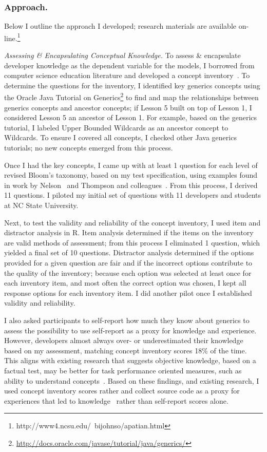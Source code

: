 \documentclass{llncs}
\begin{document}
\subsubsection{Approach.}
Below I outline the approach I developed; research materials are available on-line.\footnote{http://www4.ncsu.edu/~bijohnso/apatian.html}

\vspace{0.5em}
\noindent\textit{Assessing \& Encapsulating Conceptual Knowledge.}
To assess \& encapsulate developer knowledge as the dependent variable for the models, I borrowed from computer science education literature and developed a concept inventory~\cite{tew2010assessing}. 
To determine the questions for the inventory, I identified key generics concepts using the Oracle Java Tutorial on Generics\footnote{\url{http://docs.oracle.com/javase/tutorial/java/generics/}} to find and map the relationships between generics concepts and ancestor concepts; if Lesson 5 built on top of Lesson 1, I considered Lesson 5 an ancestor of Lesson 1. For example, based on the generics tutorial, I labeled Upper Bounded Wildcards as an ancestor concept to Wildcards. To ensure I covered all concepts, I checked other Java generics tutorials; no new concepts emerged from this process.

Once I had the key concepts, I came up with at least 1 question for each level of revised Bloom's taxonomy, based on my test specification, using examples found in work by Nelson~\cite{nelson1967testing} and Thompson and colleagues~\cite{thompson2008bloom}.
From this process, I derived 11 questions.
I piloted my initial set of questions with 11 developers and students at NC State University. 

Next, to test the validity and reliability of the concept inventory, I used item and distractor analysis in R. Item analysis determined if the items on the inventory are valid methods of assessment; from this process I eliminated 1 question, which yielded a final set of 10 questions.  Distractor analysis determined if the options provided for a given question are fair and if the incorrect options contribute to the quality of the inventory; because each option was selected at least once for each inventory item, and most often the correct option was chosen, I kept all response options for each inventory item.
I did another pilot once I established validity and reliability.

I also asked participants to self-report how much they know about generics to assess the possibility to use self-report as a proxy for knowledge and experience. However, developers almost always over- or underestimated their knowledge based on my assessment, matching concept inventory scores 18\% of the time. This aligns with existing research that suggests objective knowledge, based on a factual test, may be better for task performance oriented measures, such as ability to understand concepts~\cite{cole1992exploring,raju1995differential}. Based on these findings, and existing research, I used concept inventory scores rather and collect source code as a proxy for experiences that led to knowledge~\cite{argote2011organizational,raju1995differential} rather than self-report scores alone.
\end{document}
